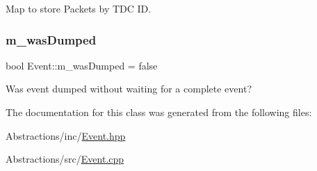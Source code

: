 Map to store Packets by T\+DC ID. 

\mbox{\label{class_event_adf297e8a9a7f7e7496dbb2e1ea61c893}} 
\subsubsection{\texorpdfstring{m\+\_\+was\+Dumped}{m\_wasDumped}}
{\footnotesize\ttfamily bool Event\+::m\+\_\+was\+Dumped = false\hspace{0.3cm}{\ttfamily [private]}}



Was event dumped without waiting for a complete event? 



The documentation for this class was generated from the following files\+:\begin{DoxyCompactItemize}
\item 
Abstractions/inc/\hyperlink{_event_8hpp}{Event.\+hpp}\item 
Abstractions/src/\hyperlink{_event_8cpp}{Event.\+cpp}\end{DoxyCompactItemize}
